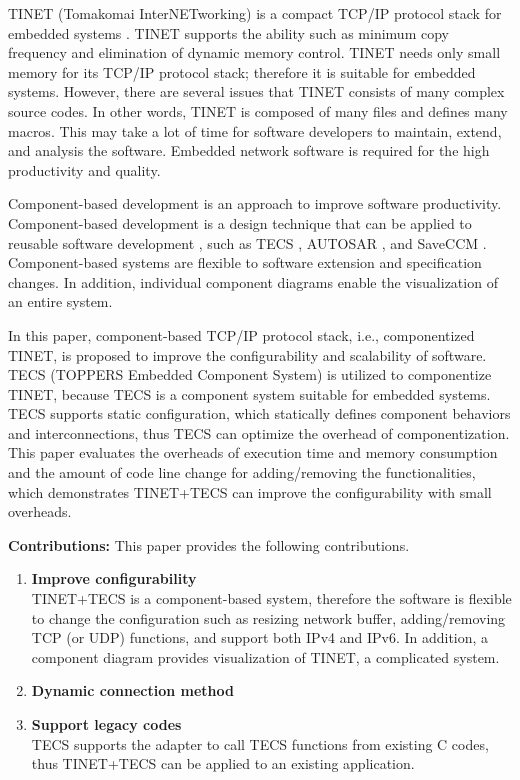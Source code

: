 \documentclass[conference]{IEEEtran/IEEEtran}
\begin{document}
TINET (Tomakomai InterNETworking) is a compact TCP/IP protocol stack for embedded systems \cite{url:TINET}.
TINET supports the ability such as minimum copy frequency and elimination of dynamic memory control.
TINET needs only small memory for its TCP/IP protocol stack; therefore it is suitable for embedded systems.
However, there are several issues that TINET consists of many complex source codes.
In other words, TINET is composed of many files and defines many macros.
This may take a lot of time for software developers to maintain, extend, and analysis the software.
Embedded network software is required for the high productivity and quality.

Component-based development is an approach to improve software productivity.
Component-based development is a design technique that can be applied to reusable software development \cite{par:Crnkovic}\cite{par:CBD}, such as TECS \cite{par:TECS}, AUTOSAR \cite{url:AUTOSAR}, and SaveCCM \cite{par:SAVEapproach}.
Component-based systems are flexible to software extension and specification changes.
In addition, individual component diagrams enable the visualization of an entire system.

In this paper, component-based TCP/IP protocol stack, i.e., componentized TINET, is proposed to improve the configurability and scalability of software.
TECS (TOPPERS Embedded Component System) \cite{par:TECS} is utilized to componentize TINET, because TECS is a component system suitable for embedded systems.
TECS supports static configuration, which statically defines component behaviors and interconnections, thus TECS can optimize the overhead of componentization.
This paper evaluates the overheads of execution time and memory consumption and the amount of code line change for adding/removing the functionalities, which demonstrates TINET+TECS can improve the configurability with small overheads.

{\bf Contributions:} This paper provides the following contributions.

\begin{enumerate}

    \item {\bf Improve configurability}\mbox{}\\
        TINET+TECS is a component-based system, therefore the software is flexible to change the configuration such as resizing network buffer, adding/removing TCP (or UDP) functions, and support both IPv4 and IPv6.
        In addition, a component diagram provides visualization of TINET, a complicated system.

    \item {\bf Dynamic connection method}\mbox{}\\
        

    \item {\bf Support legacy codes}\mbox{}\\
        TECS supports the adapter to call TECS functions from existing C codes, thus TINET+TECS can be applied to an existing application.

\end{enumerate}
\end{document}
